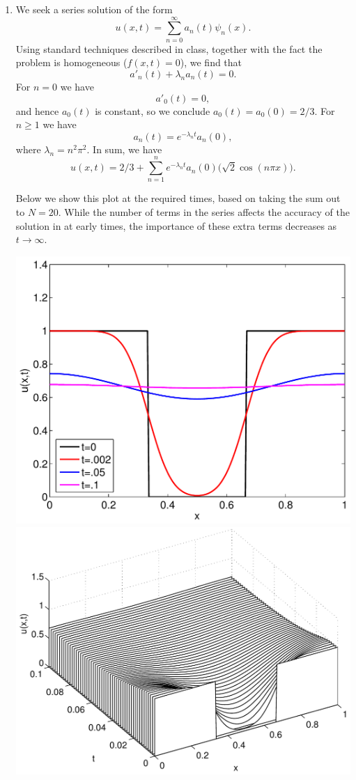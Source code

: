{\begin{solution}
\begin{enumerate}
\item 
  We seek a series solution of the form
     \[ u(x,t) = \sum_{n=0}^\infty a_n(t) \psi_n(x).\]
  Using standard techniques described in class, together with the
      fact the problem is homogeneous ($f(x,t) = 0$), 
      we find that
        \[ a'_n(t) + \lambda_n a_n(t) = 0.\]
      For $n=0$ we have
        \[ a'_0(t) = 0,\]
      and hence $a_0(t)$ is constant, so we conclude $a_0(t) = a_0(0) = 2/3$.
      For $n\ge 1$ we have
        \[ a_n(t) = e^{-\lambda_n t} a_n(0),\]
      where $\lambda_n = n^2\pi^2$.
      In sum, we have
        \[ u(x,t) = 2/3 + \sum_{n=1}^n e^{-\lambda_n t} 
                                a_n(0) \big(\sqrt{2} \cos(n\pi x) \big).\]

      Below we show this plot at the required times, based on taking the sum
      out to $N=20$.  While the number of terms in the series affects the accuracy
      of the solution in at early times, the importance of these extra terms 
      decreases as $t\to\infty$.
\begin{center}
\includegraphics[scale=0.5]{heateqn2}
\includegraphics[scale=0.5]{heateqn3}
\end{center}


\end{enumerate}
\end{solution}}
